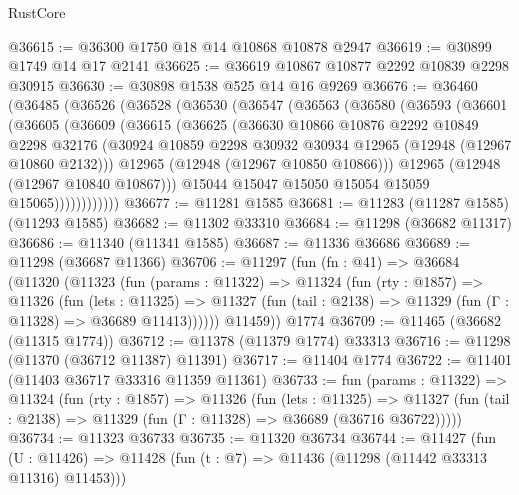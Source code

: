 \begin{lexlean}{RustCore}
\begin{coremodule}
@36615 := @36300 @1750 @18 @14 @10868 @10878 @2947
@36619 := @30899 @1749 @14 @17 @2141
@36625 := @36619 @10867 @10877 @2292 @10839 @2298 @30915
@36630 := @30898 @1538 @525 @14 @16 @9269
@36676 := @36460
    (@36485
      (@36526
        (@36528
          (@36530
            (@36547
              (@36563
                (@36580
                  (@36593
                    (@36601
                      (@36605
                        (@36609
                          (@36615
                            (@36625
                              (@36630
                                @10866
                                @10876
                                @2292
                                @10849
                                @2298
                                @32176
                                (@30924
                                  @10859
                                  @2298
                                  @30932
                                  @30934
                                  @12965
                                  (@12948 (@12967 @10860 @2132)))
                                @12965
                                (@12948 (@12967 @10850 @10866)))
                              @12965
                              (@12948 (@12967 @10840 @10867)))
                            @15044
                            @15047
                            @15050
                            @15054
                            @15059
                            @15065))))))))))))
@36677 := @11281 @1585
@36681 := @11283 (@11287 @1585) (@11293 @1585)
@36682 := @11302 @33310
@36684 := @11298 (@36682 @11317)
@36686 := @11340 (@11341 @1585)
@36687 := @11336 @36686
@36689 := @11298 (@36687 @11366)
@36706 := @11297
    (fun (fn : @41) =>
    @36684
      (@11320
        (@11323
          (fun (params : @11322) =>
          @11324
            (fun (rty : @1857) =>
            @11326
              (fun (lets : @11325) =>
              @11327 (fun (tail : @2138) => @11329 (fun (Γ : @11328) => @36689 @11413))))))
        @11459))
    @1774
@36709 := @11465 (@36682 (@11315 @1774))
@36712 := @11378 (@11379 @1774) @33313
@36716 := @11298 (@11370 (@36712 @11387) @11391)
@36717 := @11404 @1774
@36722 := @11401 (@11403 @36717 @33316 @11359 @11361)
@36733 := fun (params : @11322) =>
  @11324
    (fun (rty : @1857) =>
    @11326
      (fun (lets : @11325) =>
      @11327 (fun (tail : @2138) => @11329 (fun (Γ : @11328) => @36689 (@36716 @36722)))))
@36734 := @11323 @36733
@36735 := @11320 @36734
@36744 := @11427
    (fun (U : @11426) => @11428 (fun (t : @7) => @11436 (@11298 (@11442 @33313 @11316) @11453)))

\end{coremodule}
\end{lexlean}
